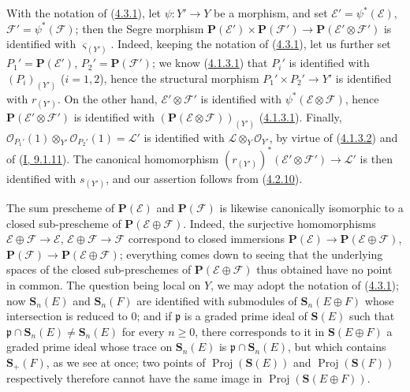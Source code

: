 \begin{env}[4.3.5]
\label{II.4.3.5}
With the notation of (\hyperref[II.4.3.1]{4.3.1}), let
$\psi:Y'\to Y$ be a morphism, and set
$\mathcal{E}'=\psi^*(\mathcal{E})$, $\mathcal{F}'=\psi^*(\mathcal{F})$;
then the Segre morphism
$\mathbf{P}(\mathcal{E}')\times\mathbf{P}(\mathcal{F}')
\to\mathbf{P}(\mathcal{E}'\otimes\mathcal{F}')$ is identified with
$\varsigma_{(Y')}$. Indeed, keeping the notation of
(\hyperref[II.4.3.1]{4.3.1}), let us further set
$P_1'=\mathbf{P}(\mathcal{E}')$, $P_2'=\mathbf{P}(\mathcal{F}')$; we know
(\hyperref[II.4.1.3.1]{4.1.3.1}) that $P_i'$ is identified with $(P_i)_{(Y')}$
($i=1,2$), hence the structural morphism $P_1'\times P_2'\to Y'$ is identified
with $r_{(Y')}$. On the other hand,
$\mathcal{E}'\otimes\mathcal{F}'$ is identified with
$\psi^*(\mathcal{E}\otimes\mathcal{F})$, hence
$\mathbf{P}(\mathcal{E}'\otimes\mathcal{F}')$ is identified with
$(\mathbf{P}(\mathcal{E}\otimes\mathcal{F}))_{(Y')}$
(\hyperref[II.4.1.3.1]{4.1.3.1}). Finally,
$\mathcal{O}_{P_1'}(1)\otimes_{Y'}\mathcal{O}_{P_2'}(1)=\mathcal{L}'$
is identified with $\mathcal{L}\otimes_Y\mathcal{O}_{Y'}$, by virtue of
(\hyperref[II.4.1.3.2]{4.1.3.2}) and of
(\hyperref[I.9.1.11]{I, 9.1.11}). The canonical homomorphism
$(r_{(Y')})^*(\mathcal{E}'\otimes\mathcal{F}')\to\mathcal{L}'$ is then
identified with $s_{(Y')}$, and our assertion follows from
(\hyperref[II.4.2.10]{4.2.10}).
\end{env}

\begin{remark}[4.3.6]
\label{II.4.3.6}
The sum prescheme of $\mathbf{P}(\mathcal{E})$ and
$\mathbf{P}(\mathcal{F})$ is likewise canonically isomorphic to a
closed sub-prescheme of $\mathbf{P}(\mathcal{E}\oplus\mathcal{F})$.
Indeed, the surjective homomorphisms
$\mathcal{E}\oplus\mathcal{F}\to\mathcal{E}$,
$\mathcal{E}\oplus\mathcal{F}\to\mathcal{F}$ correspond to closed
immersions
$\mathbf{P}(\mathcal{E})\to\mathbf{P}(\mathcal{E}\oplus\mathcal{F})$,
$\mathbf{P}(\mathcal{F})\to\mathbf{P}(\mathcal{E}\oplus\mathcal{F})$;
everything comes down to seeing that the underlying spaces of the closed
sub-preschemes of $\mathbf{P}(\mathcal{E}\oplus\mathcal{F})$ thus obtained have
no point in common. The question being local on $Y$, we may adopt the notation of
(\hyperref[II.4.3.1]{4.3.1}); now $\mathbf{S}_n(E)$ and
$\mathbf{S}_n(F)$ are identified with submodules of
$\mathbf{S}_n(E\oplus F)$ whose intersection is reduced to $0$; and if
$\mathfrak{p}$ is a graded prime ideal of $\mathbf{S}(E)$ such that
$\mathfrak{p}\cap\mathbf{S}_n(E)\neq\mathbf{S}_n(E)$ for every $n\geq0$,
there corresponds to it in $\mathbf{S}(E\oplus F)$ a graded prime ideal whose
trace on $\mathbf{S}_n(E)$ is
$\mathfrak{p}\cap\mathbf{S}_n(E)$, but which contains $\mathbf{S}_+(F)$,
as we see at once; two points of
$\operatorname{Proj}(\mathbf{S}(E))$ and
$\operatorname{Proj}(\mathbf{S}(F))$ respectively therefore cannot have
the same image in $\operatorname{Proj}(\mathbf{S}(E\oplus F))$.
\end{remark}


